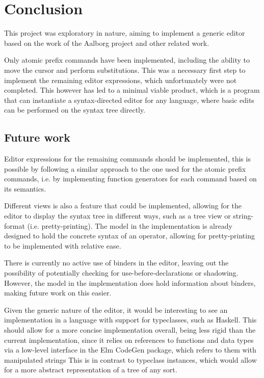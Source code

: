 \section{Conclusion}
This project was exploratory in nature, aiming to implement a generic editor
based on the work of the Aalborg project\cite{aalborg} and other related work.

Only atomic prefix commands have been implemented, including the ability to
move the cursor and perform substitutions. This was a necessary first step
to implement the remaining editor expressions, which unfortunately were not
completed. This however has led to a minimal viable product, which is a
program that can instantiate a syntax-directed editor for any language, where basic edits can be performed on the syntax tree directly.

\subsection{Future work}
Editor expressions for the remaining commands should be implemented, this is possible by following a similar approach to the one used for the atomic prefix commands, i.e. by implementing function generators for each command based on its semantics.


Different views is also a feature that could be implemented, allowing for the editor to display the syntax tree in different ways, such as a tree view or string-format (i.e. pretty-printing). The model in the implementation is already designed to hold the concrete syntax of an operator, allowing for pretty-printing to be implemented with relative ease.

There is currently no active use of binders in the editor, leaving 
out the possibility of potentially checking for use-before-declarations or 
shadowing. However, the model in the implementation does hold information about binders, making future work on this easier.

Given the generic nature of the editor, it would be interesting to see
an implementation in a language with support for typeclasses, such as Haskell.
This should allow for a more concise implementation overall, being less rigid
than the current implementation, since it relies on references to functions and
data types via a low-level interface in the Elm CodeGen package, which refers
to them with manipulated strings
This is in contrast to typeclass
instances, which would allow for a more abstract representation of a tree
of any sort.


